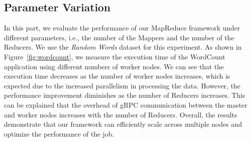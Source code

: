 \subsection{Parameter Variation}
\label{subsec:para}

In this part, we evaluate the performance of our MapReduce framework under different parameters, i.e., the number of the Mappers and the number of the Reducers. We use the \textit{Random Words} dataset for this experiment. As shown in Figure~\ref{fig:wordcount}, we measure the execution time of the WordCount application using different numbers of worker nodes. We can see that the execution time decreases as the number of worker nodes increases, which is expected due to the increased parallelism in processing the data. However, the performance improvement diminishes as the number of Reducers increases. This can be explained that the overhead of gRPC communication between the master and worker nodes increases with the number of Reducers. Overall, the results demonstrate that our framework can efficiently scale across multiple nodes and optimize the performance of the job.